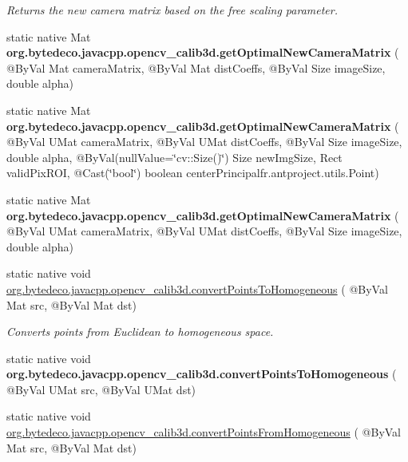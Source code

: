 \begin{DoxyCompactItemize}
\begin{DoxyCompactList}\small\item\em Returns the new camera matrix based on the free scaling parameter. \end{DoxyCompactList}\item 
\mbox{\label{group__calib3d_ga234ca2b40668329f15397d889fc3fe2f}} 
static native Mat {\bfseries org.\+bytedeco.\+javacpp.\+opencv\+\_\+calib3d.\+get\+Optimal\+New\+Camera\+Matrix} ( @By\+Val Mat camera\+Matrix, @By\+Val Mat dist\+Coeffs, @By\+Val Size image\+Size, double alpha)
\item 
\mbox{\label{group__calib3d_ga3fbd9bd21e0f29babcb1e4555c3331d0}} 
static native Mat {\bfseries org.\+bytedeco.\+javacpp.\+opencv\+\_\+calib3d.\+get\+Optimal\+New\+Camera\+Matrix} ( @By\+Val U\+Mat camera\+Matrix, @By\+Val U\+Mat dist\+Coeffs, @By\+Val Size image\+Size, double alpha, @By\+Val(null\+Value=\char`\"{}cv\+::\+Size()\char`\"{}) Size new\+Img\+Size, Rect valid\+Pix\+R\+OI, @Cast(\char`\"{}bool\char`\"{}) boolean center\+Principal\+fr.antproject.utils.Point)
\item 
\mbox{\label{group__calib3d_gadb46dcf5a338d65e1d2c3d714945b5dd}} 
static native Mat {\bfseries org.\+bytedeco.\+javacpp.\+opencv\+\_\+calib3d.\+get\+Optimal\+New\+Camera\+Matrix} ( @By\+Val U\+Mat camera\+Matrix, @By\+Val U\+Mat dist\+Coeffs, @By\+Val Size image\+Size, double alpha)
\item 
static native void \hyperlink{group__calib3d_gaaf5de214950c5c904cd996ac5f73bff6}{org.\+bytedeco.\+javacpp.\+opencv\+\_\+calib3d.\+convert\+Points\+To\+Homogeneous} ( @By\+Val Mat src, @By\+Val Mat dst)
\begin{DoxyCompactList}\small\item\em Converts points from Euclidean to homogeneous space. \end{DoxyCompactList}\item 
\mbox{\label{group__calib3d_gaf23d0d3475f2551af8dc44072fc59f63}} 
static native void {\bfseries org.\+bytedeco.\+javacpp.\+opencv\+\_\+calib3d.\+convert\+Points\+To\+Homogeneous} ( @By\+Val U\+Mat src, @By\+Val U\+Mat dst)
\item 
static native void \hyperlink{group__calib3d_ga8d818140f4ee16a68518f61d0dbc2de9}{org.\+bytedeco.\+javacpp.\+opencv\+\_\+calib3d.\+convert\+Points\+From\+Homogeneous} ( @By\+Val Mat src, @By\+Val Mat dst)

\end{DoxyCompactItemize}
